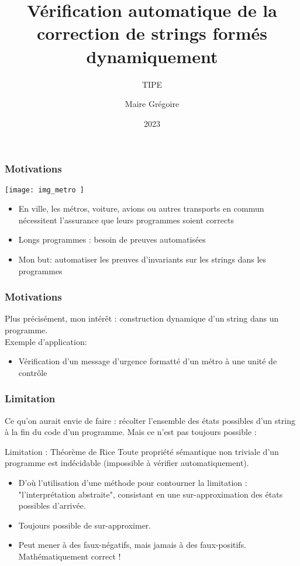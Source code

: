 \documentclass{beamer}
\title{Vérification automatique de la correction de strings formés dynamiquement}
\subtitle{TIPE}
\author{Maire Grégoire}
\date{2023}
\begin{document}
\frame{\titlepage}

\begin{frame}
  \frametitle{Motivations}
  \texttt{[image:  img\_metro ]}
  \begin{itemize}
    \item En ville, les métros, voiture, avions ou autres transports en commun
      nécessitent l'assurance que leurs programmes soient corrects
    \item Longs programmes : besoin de preuves automatisées
    \item Mon but: automatiser les preuves d'invariants sur les strings dans les programmes
  \end{itemize}
\end{frame}

\begin{frame}
  \frametitle{Motivations}
  Plus précisément, mon intérêt : construction dynamique d'un string dans un programme. \\
  Exemple d'application:
  \begin{itemize}
    \item Vérification d'un message d'urgence formatté d'un métro à une unité de contrôle
  \end{itemize}
  
\end{frame}

\begin{frame}
  \frametitle{Limitation}
  Ce qu'on aurait envie de faire : récolter l'ensemble des états possibles d'un string
  à la fin du code d'un programme. Mais ce n'est pas toujours possible :
  \begin{alertblock}{Limitation : Théorème de Rice}
  Toute propriété sémantique non triviale d'un programme est indécidable (impossible à vérifier automatiquement).
  \end{alertblock}
  \begin{itemize}
    \item D'où l'utilisation d'une méthode pour contourner la limitation :
      "l'interprétation abstraite", consistant en une sur-approximation des états possibles d'arrivée. \\
    \item Toujours possible de sur-approximer.
    \item Peut mener à des faux-négatifs, mais jamais à des faux-positifs. Mathématiquement correct !
  \end{itemize}
\end{frame}
\end{document}
